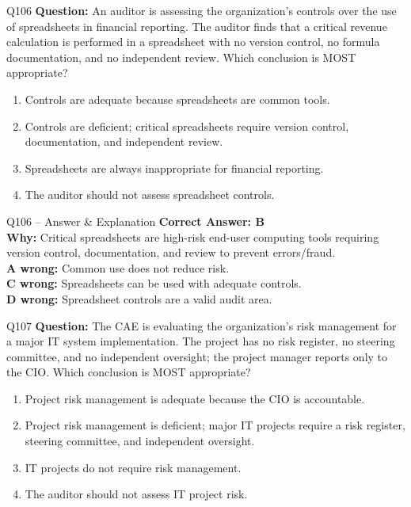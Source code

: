 \documentclass[aspectratio=169,10pt]{beamer}
\begin{document}
	\begin{frame}[t]{Q106}
		\small
		\textbf{Question:} An auditor is assessing the organization's controls over the use of spreadsheets in financial reporting. The auditor finds that a critical revenue calculation is performed in a spreadsheet with no version control, no formula documentation, and no independent review. Which conclusion is MOST appropriate?
		\begin{enumerate}[label=\Alph*.,itemsep=1pt,topsep=2pt]
			\item Controls are adequate because spreadsheets are common tools.
			\item Controls are deficient; critical spreadsheets require version control, documentation, and independent review.
			\item Spreadsheets are always inappropriate for financial reporting.
			\item The auditor should not assess spreadsheet controls.
		\end{enumerate}
	\end{frame}
	
	\begin{frame}[t]{Q106 -- Answer \& Explanation}
		\small
		\textbf{Correct Answer: B} \\[4pt]
		\textbf{Why:} Critical spreadsheets are high-risk end-user computing tools requiring version control, documentation, and review to prevent errors/fraud. \\[4pt]
		\textbf{A wrong:} Common use does not reduce risk. \\[2pt]
		\textbf{C wrong:} Spreadsheets can be used with adequate controls. \\[2pt]
		\textbf{D wrong:} Spreadsheet controls are a valid audit area.
	\end{frame}
	
	\begin{frame}[t]{Q107}
		\small
		\textbf{Question:} The CAE is evaluating the organization's risk management for a major IT system implementation. The project has no risk register, no steering committee, and no independent oversight; the project manager reports only to the CIO. Which conclusion is MOST appropriate?
		\begin{enumerate}[label=\Alph*.,itemsep=1pt,topsep=2pt]
			\item Project risk management is adequate because the CIO is accountable.
			\item Project risk management is deficient; major IT projects require a risk register, steering committee, and independent oversight.
			\item IT projects do not require risk management.
			\item The auditor should not assess IT project risk.
		\end{enumerate}
	\end{frame}
	
\end{document}
